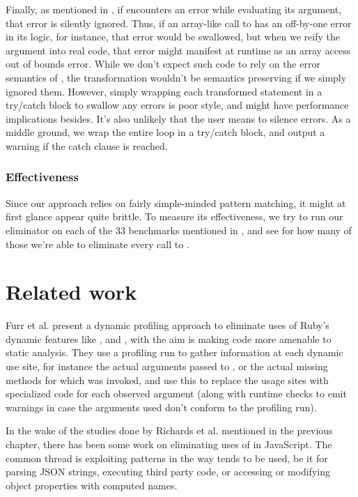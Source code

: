 Finally, as mentioned in , if  encounters an error
while evaluating its argument, that error is silently ignored. Thus, if an
array-like call to  has an off-by-one error in its logic, for
instance, that error would be swallowed, but when we reify the argument into
real code, that error might manifest at runtime as an array access out of
bounds error. While we don't expect such code to rely on the error semantics of
, the transformation wouldn't be semantics preserving if we simply
ignored them. However, simply wrapping each transformed statement in a
try/catch block to swallow any errors is poor style, and might have performance
implications besides. It's also unlikely that the user means to silence errors.
As a middle ground, we wrap the entire loop in a try/catch block, and output a
warning if the catch clause is reached.

\subsubsection{Effectiveness}

Since our approach relies on fairly simple-minded pattern matching, it might at
first glance appear quite brittle. To measure its effectiveness, we try to run
our eliminator on each of the 33 benchmarks mentioned in
, and see for how many of those we're able to
eliminate every call to .

\section{Related work}

Furr et al. \cite{ProfileGuidedStaticTyping} present a dynamic profiling
approach to eliminate uses of Ruby's dynamic features like ,
 and , with the aim is making code more
amenable to static analysis. They use a profiling run to gather information at
each dynamic use site, for instance the actual arguments passed to ,
or the actual missing methods for which  was invoked, and
use this to replace the usage sites with specialized code for each observed
argument (along with runtime checks to emit warnings in case the arguments used
don't conform to the profiling run).

In the wake of the studies done by Richards et al.
\cite{DynamicBehaviorJavaScript, TheEvalThatMenDo} mentioned in the previous
chapter, there has been some work on eliminating uses of  in
JavaScript. The common thread is exploiting patterns in the way 
tends to be used, be it for parsing JSON strings, executing third party code,
or accessing or modifying object properties with computed names.

